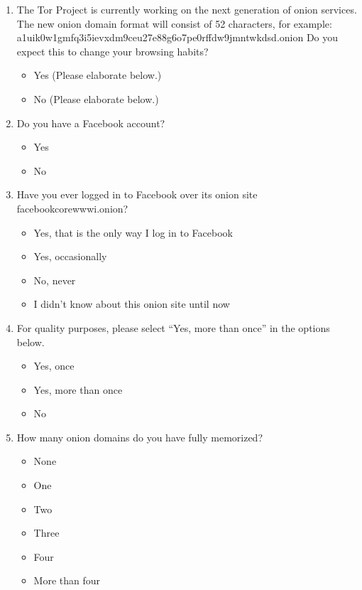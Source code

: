 \begin{enumerate}
    \item The Tor Project is currently working on the next generation of onion
        services. The new onion domain format will consist of 52 characters,
        for example: a1uik0w1gmfq3i5ievxdm9ceu27e88g6o7pe0rffdw9jmntwkdsd.onion
        Do you expect this to change your browsing habits?
        \begin{itemize}[label=$\Circle$]
            \item Yes (Please elaborate below.)
            \item No (Please elaborate below.)
        \end{itemize}

    \item Do you have a Facebook account?
        \begin{itemize}[label=$\Circle$]
            \item Yes
            \item No
        \end{itemize}

    \item Have you ever logged in to Facebook over its onion site
        facebookcorewwwi.onion?
        \begin{itemize}[label=$\Circle$]
            \item Yes, that is the only way I log in to Facebook
            \item Yes, occasionally
            \item No, never
            \item I didn't know about this onion site until now
        \end{itemize}

    \item For quality purposes, please select ``Yes, more than once'' in the
        options below.
        \begin{itemize}[label=$\Circle$]
            \item Yes, once
            \item Yes, more than once
            \item No
        \end{itemize}

    \item How many onion domains do you have fully memorized?
        \begin{itemize}[label=$\Circle$]
            \item None
            \item One
            \item Two
            \item Three
            \item Four
            \item More than four
        \end{itemize}


\end{enumerate}
